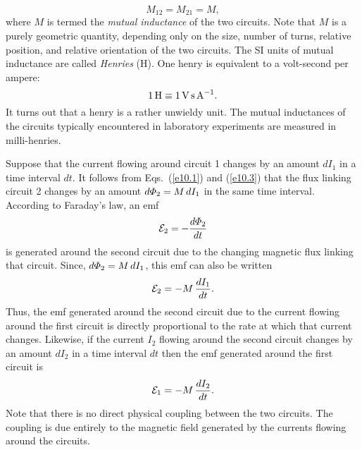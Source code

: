 \begin{equation}\label{e10.3}
M_{12}= M_{21} = M,
\end{equation}
where $M$ is termed the {\em mutual inductance}\/ of the two circuits. Note that
$M$ is a purely geometric quantity, depending only on the  size, number of turns,
relative position, and relative
orientation of the two circuits. The SI units of mutual inductance
are called {\em Henries}\/ (H). One henry is equivalent to a volt-second
per ampere:
\begin{equation}
1\,{\rm H} \equiv 1\,{\rm V\,s\,A}^{-1}.
\end{equation}
It turns out that a henry is a rather unwieldy unit. The mutual inductances of 
the circuits typically encountered in laboratory experiments
are measured in
 milli-henries. 
 
Suppose that the current flowing around circuit 1 changes by an amount
$d I_1$ in a time interval $d t$. It follows from
Eqs.~(\ref{e10.1}) and (\ref{e10.3}) that the flux linking circuit 2 changes by an amount
$d{\mit\Phi}_{2} = M\,d I_1$ in the same time interval.
According to Faraday's law, an emf 
\begin{equation}
{\cal E}_2 = - \frac{d{\mit\Phi}_{2}}{d t}
\end{equation}
is generated around the second circuit due to the changing magnetic flux
linking that circuit. Since, $d{\mit\Phi}_{2} = M\,d I_1$,
this emf can also be written
\begin{equation}\label{e10.6}
{\cal E}_2 = - M\, \frac{d I_1}{d  t}.
\end{equation}
Thus, the emf generated around the second circuit due to
the current flowing around  the first circuit is directly proportional
to the rate at which that  current changes.
Likewise, if the current $I_2$ flowing around the second circuit changes by an
amount $d I_2$ in a time interval $d t$ then
the emf generated around the first circuit is
\begin{equation}
{\cal E}_1 = - M\, \frac{d I_2}{d t}.
\end{equation}
Note that there is no direct physical coupling between the two circuits. The coupling
is due entirely to the magnetic field generated by the currents flowing around the
circuits. 

